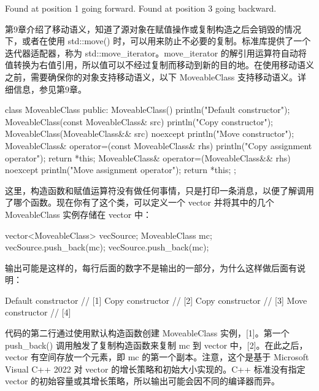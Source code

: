 \begin{shell}
Found at position 1 going forward.
Found at position 3 going backward.
\end{shell}


第9章介绍了移动语义，知道了源对象在赋值操作或复制构造之后会销毁的情况下，或者在使用 std::move() 时，可以用来防止不必要的复制。标准库提供了一个迭代器适配器，称为 std::move\_iterator。move\_iterator 的解引用运算符自动将值转换为右值引用，所以值可以不经过复制而移动到新的目的地。在使用移动语义之前，需要确保你的对象支持移动语义，以下 MoveableClass 支持移动语义。详细信息，参见第9章。

\begin{cpp}
class MoveableClass
{
    public:
        MoveableClass() {
            println("Default constructor");
        }
        MoveableClass(const MoveableClass& src) {
            println("Copy constructor");
        }
        MoveableClass(MoveableClass&& src) noexcept {
            println("Move constructor");
        }
        MoveableClass& operator=(const MoveableClass& rhs) {
            println("Copy assignment operator");
            return *this;
        }
        MoveableClass& operator=(MoveableClass&& rhs) noexcept {
            println("Move assignment operator");
            return *this;
        }
};
\end{cpp}

这里，构造函数和赋值运算符没有做任何事情，只是打印一条消息，以便了解调用了哪个函数。现在你有了这个类，可以定义一个 vector 并将其中的几个 MoveableClass 实例存储在 vector 中：

\begin{cpp}
vector<MoveableClass> vecSource;
MoveableClass mc;
vecSource.push_back(mc);
vecSource.push_back(mc);
\end{cpp}

输出可能是这样的，每行后面的数字不是输出的一部分，为什么这样做后面有说明：

\begin{cpp}
Default constructor // [1]
Copy constructor // [2]
Copy constructor // [3]
Move constructor // [4]
\end{cpp}

代码的第二行通过使用默认构造函数创建 MoveableClass 实例，[1]。第一个 push\_back() 调用触发了复制构造函数来复制 mc 到 vector 中，[2]。在此之后，vector 有空间存放一个元素，即 mc 的第一个副本。注意，这个是基于 Microsoft Visual C++ 2022 对 vector 的增长策略和初始大小实现的。C++ 标准没有指定 vector 的初始容量或其增长策略，所以输出可能会因不同的编译器而异。

